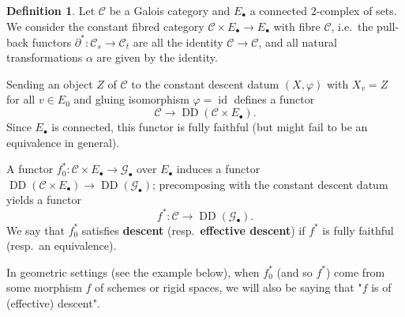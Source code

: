 \documentclass[a4paper,twoside,11pt,reqno]{amsart}
\newcommand{\cC}{{\mathcal C}}
\newcommand{\cG}{{\mathcal G}}
\newcommand{\la}{\longrightarrow}
\DeclareMathOperator{\id}{id}
\newcommand{\ph}{\varphi}
\DeclareMathOperator{\Desc}{DD}
\theoremstyle{definition}
\newtheorem{defi}[thm]{Definition}
\numberwithin{equation}{subsection}
\begin{document}
\begin{defi}
    Let $\cC$ be a Galois category and $E_\bullet$ a connected $2$-complex of sets. We consider the constant fibred category $\cC \times E_\bullet \to E_\bullet$ with fibre $\cC$, i.e.~the pull-back functors $\partial^\ast\colon  \cC_s \to \cC_t$ are all the identity $\cC \to \cC$, and all natural transformations $\alpha$ are given by the identity.  
    
    Sending an object $Z$ of $\cC$ to the constant descent datum $(X,\ph)$ with $X_v = Z$ for all $v \in E_0$ and gluing isomorphism $\ph = \id$ defines a functor
    \[
    \cC \la \Desc(\cC \times E_\bullet).
    \]
    Since $E_\bullet$ is connected, this functor is fully faithful (but might fail to be an equivalence in general).

    A functor $f_0^\ast\colon  \cC \times E_\bullet \to \cG_\bullet$ over $E_\bullet$ induces a functor $\Desc(\cC \times E_\bullet) \to \Desc(\cG_\bullet)$; precomposing with the constant descent datum yields a functor
    \[
    f^\ast \colon \cC \la \Desc(\cG_\bullet).
    \]
    We say that $f_0^\ast$ satisfies \textbf{descent} (resp.\ \textbf{effective descent}) if $f^\ast$ is fully faithful (resp.\ an equivalence).

    In geometric settings (see the example below), when $f_0^*$ (and so $f^*$) come from some morphism $f$ of schemes or rigid spaces, we will also be saying that "$f$ is of (effective) descent".
\end{defi}
\end{document}
